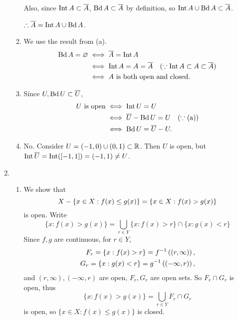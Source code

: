 \documentclass[12pt]{report}
\newcommand{\prob}[1]{\item[\large\textbf{\sffamily #1.}]}
\newcommand{\subprob}[1]{\item[\textbf{\sffamily (#1)}]}
\begin{document}
\begin{enumerate}
\begin{enumerate}
        Also, since \(\operatorname{Int} A \subset \overline{A}\), \(\operatorname{Bd} A \subset \overline{A}\) by definition, so \(\operatorname{Int} A \cup \operatorname{Bd} A \subset \overline{A}\).

        \bigskip

        \(\therefore \overline{A} = \operatorname{Int} A \cup \operatorname{Bd} A\).

        \subprob{b} We use the result from (a).
        \[
            \begin{aligned}
                \operatorname{Bd} A = \varnothing & \iff \overline{A} = \operatorname{Int} A                                                       \\
                                    & \iff \operatorname{Int} A = A = \overline{A} \quad (\because \operatorname{Int} A \subset A \subset \overline{A}) \\
                                    & \iff A \text{ is both open and closed}.
            \end{aligned}
        \]

        \subprob{c} Since \(U, \operatorname{Bd} U \subset \overline{U}\),
        \[
            \begin{aligned}
                U \text{ is open} & \iff \operatorname{Int} U = U                                       \\
                                  & \iff \overline{U} - \operatorname{Bd} U  = U \quad (\because \text{(a)}) \\
                                  & \iff \operatorname{Bd} U = \overline{U} - U.
            \end{aligned}
        \]

        \subprob{d} No. Consider \(U = (-1, 0) \cup (0, 1) \subset \mathbb{R}\). Then \(U\) is open, but \(\operatorname{Int} \overline{U} = \operatorname{Int}([-1, 1]) = (-1, 1) \neq U\).
    \end{enumerate}

    \prob{7}
    \begin{enumerate}
        \subprob{a} We show that
        \[
            X - \{x \in X : f(x) \leq g(x) \} = \{x \in X: f(x) > g(x)\}
        \]
        is open. Write
        \[
            \{x : f(x) > g(x)\} = \bigcup_{r \in Y} \{x : f(x) > r\} \cap \{x : g(x) < r\}
        \]
        Since \(f, g\) are continuous, for \(r \in Y\),
        \[
            \begin{aligned}
                F_r = \{x : f(x) > r\} = f^{-1}\left( (r, \infty) \right), \\
                G_r = \{x : g(x) < r\} = g^{-1}\left( (-\infty, r) \right),
            \end{aligned}
        \]
        and \((r, \infty), (-\infty, r)\) are open, \(F_r, G_r\) are open sets. So \(F_r \cap G_r\) is open, thus
        \[
            \{x : f(x) > g(x)\} = \bigcup_{r \in Y} F_r \cap G_r
        \]
        is open, so \(\{x \in X : f(x) \leq g(x)\}\) is closed.


\end{enumerate}
\end{enumerate}
\end{document}
